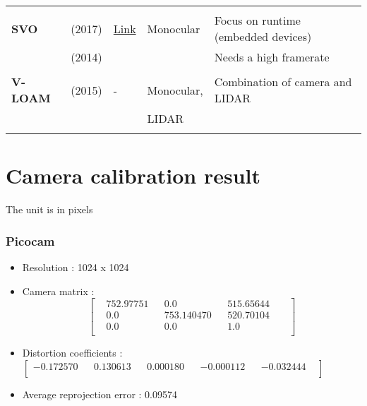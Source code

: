 {\begin{longtable}{l|l|l|l|l}
			&                                   &                                                                    &                       &\\
			\textbf{SVO}           & \cite{7782863} (2017)         & {\href{https://github.com/uzh-rpg/rpg_svo}{Link}}                  & Monocular             & Focus on runtime (embedded devices)\\
			& \cite{Forster2014ICRA} (2014)        &                                                                    &                       & Needs a high framerate\\
			&                                   &                                                                    &                       &\\
			\textbf{V-LOAM}        & \cite{Zhang2015} (2015)           & -                                                                  & Monocular,            & Combination of camera and LIDAR\\
			&                                   &                                                                    & LIDAR                 &\\
			&                                   &                                                                    &                       &\\
		\end{longtable}				
		\newpage
	
\section{Camera calibration result}
\label{section:A.2}
The unit is in pixels
\subsubsection{Picocam}

\begin{itemize}
	\item Resolution : 1024 x 1024
	\item Camera matrix : 
	      \begin{equation*}     
			\begin{bmatrix}
				& 752.97751 & & 0.0 & &  515.65644 & &  \\
				& 0.0 & & 753.140470 & &520.70104  & &\\
				& 0.0 & & 0.0 & &   1.0  & &\\
			\end{bmatrix}
			 \end{equation*}
	\item Distortion coefficients : 
	$ \begin{bmatrix}  
	 	  -0.172570    & & 0.130613  & & 0.000180   &  &-0.000112  & & -0.032444 & \\
	 \end{bmatrix} $ 
	\item Average reprojection error : 0.09574
\end{itemize}

}

